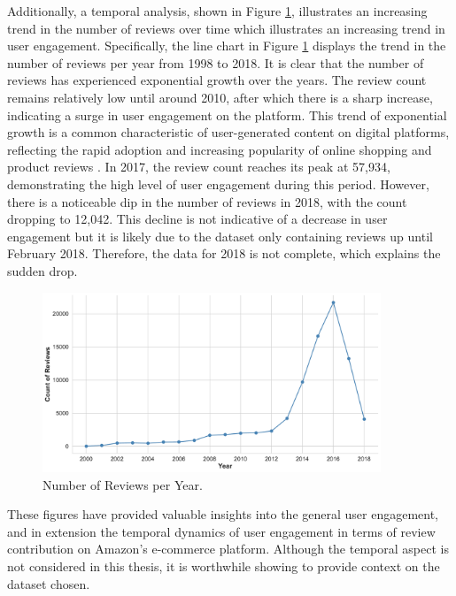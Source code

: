 Additionally, a temporal analysis, shown in Figure \ref{fig:reviews per year}, illustrates an increasing trend in the number of reviews over time which illustrates an increasing trend in user engagement. Specifically, the line chart in Figure \ref{fig:reviews per year} displays the trend in the number of reviews per year from 1998 to 2018. It is clear that the number of reviews has experienced exponential growth over the years. The review count remains relatively low until around 2010, after which there is a sharp increase, indicating a surge in user engagement on the platform. This trend of exponential growth is a common characteristic of user-generated content on digital platforms, reflecting the rapid adoption and increasing popularity of online shopping and product reviews \cite{alzoubi2022effect}. In 2017, the review count reaches its peak at 57,934, demonstrating the high level of user engagement during this period. However, there is a noticeable dip in the number of reviews in 2018, with the count dropping to 12,042. This decline is not indicative of a decrease in user engagement but it is likely due to the dataset only containing reviews up until February 2018. Therefore, the data for 2018 is not complete, which explains the sudden drop.

\begin{figure}[ht]
  \centering
  \includegraphics[width=0.9\textwidth]{Figures/reviews_per_year.pdf} %
  \caption{Number of Reviews per Year.}
  \label{fig:reviews per year}
\end{figure}

These figures have provided valuable insights into the general user engagement, and in extension the temporal dynamics of user engagement in terms of review contribution on Amazon's e-commerce platform. Although the temporal aspect is not considered in this thesis, it is worthwhile showing to provide context on the dataset chosen. 

